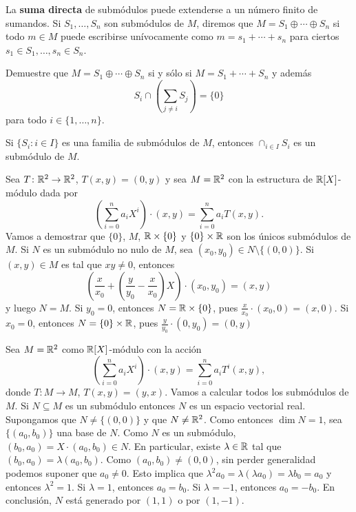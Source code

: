 La \textbf{suma directa} de submódulos puede extenderse a un número finito de sumandos. 
Si $S_1,\dots,S_n$ son submódulos de $M$, diremos que
$M=S_1\oplus\cdots\oplus S_n$ si todo $m\in M$ puede escribirse unívocamente
como $m=s_1+\cdots+s_n$ para ciertos $s_1\in S_1,\dots,s_n\in S_n$. 

\begin{exercise}
Demuestre que $M=S_1\oplus\cdots\oplus S_n$ si y sólo si
$M=S_1+\cdots+S_n$ y además 
\[
S_i\cap\left(\sum_{j\ne i}S_j\right)=\{0\}
\]	
para todo $i\in\{1,\dots,n\}$.
\end{exercise}

\begin{exercise}
Si $\{S_i:i\in I\}$ es una familia de submódulos de $M$, entonces $\cap_{i\in I}S_i$ es un submódulo de $M$.
\end{exercise}

\begin{example}
Sea $T\colon\mathbb{R}^2\to\mathbb{R}^2$, $T(x,y)=(0,y)$ y sea $M=\mathbb{R}^2$ con la estructura de $\mathbb{R}[X]$-módulo dada por
\[
\left(\sum_{i=0}^n a_iX^i\right)\cdot (x,y)=\sum_{i=0}^n a_iT(x,y).
\]
Vamos a demostrar que
$\{0\}$, $M$, $\mathbb{R}\times\{0\}$ y $\{0\}\times\mathbb{R}$ son los únicos submódulos de $M$. Si $N$ es un submódulo no nulo de $M$, sea
$(x_0,y_0)\in N\setminus\{(0,0)\}$. Si $(x,y)\in M$ es tal que $xy\ne 0$, entonces
\[
\left(\frac{x}{x_0}+\left(\frac{y}{y_0}-\frac{x}{x_0}\right)X\right)\cdot (x_0,y_0)=(x,y) 
\]
y luego $N=M$. Si $y_0=0$, entonces $N=\mathbb{R}\times\{0\}$, pues $\frac{x}{x_0}\cdot (x_0,0)=(x,0)$. Si $x_0=0$, entonces
$N=\{0\}\times\mathbb{R}$, pues 
$\frac{y}{y_0}\cdot (0,y_0)=(0,y)$ 
\end{example}


\begin{example}
Sea $M=\mathbb{R}^2$ como $\mathbb{R}[X]$-módulo con la acción
\[
\left(\sum_{i=0}^n a_iX^i\right)\cdot (x,y)=\sum_{i=0}^n a_iT^i(x,y),
\]
donde $T\colon M\to M$, $T(x,y)=(y,x)$. 
Vamos a calcular todos los submódulos de $M$. 
Si $N\subseteq M$ es un submódulo entonces $N$ es un espacio vectorial real. Supongamos que $N\ne\{(0,0)\}$ y que $N\ne\mathbb{R}^2$. Como entonces $\dim N=1$, 
sea $\{(a_0,b_0)\}$ una base de $N$. Como $N$ es un submódulo,
$(b_0,a_0)=X\cdot (a_0,b_0)\in N$. En particular, existe $\lambda\in\mathbb{R}$ tal que $(b_0,a_0)=\lambda (a_0,b_0)$. Como $(a_0,b_0)\ne(0,0)$, sin perder generalidad
podemos suponer que $a_0\ne 0$. Esto implica que
$\lambda^2 a_0=\lambda (\lambda a_0)=\lambda b_0=a_0$ y entonces $\lambda^2=1$. Si $\lambda=1$, entonces
$a_0=b_0$. Si $\lambda=-1$, entonces $a_0=-b_0$. En conclusión, $N$ está generado por $(1,1)$ o por $(1,-1)$.  
\end{example}

